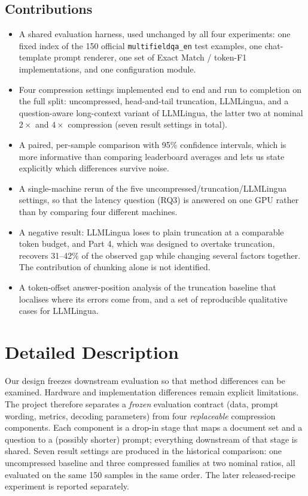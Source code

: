 \documentclass[10pt,a4paper,twocolumn]{article}
\begin{document}
\subsection{Contributions}

\begin{itemize}
    \item A shared evaluation harness, used unchanged by all four experiments: one
    fixed index of the 150 official \texttt{multifieldqa\_en} test examples, one
    chat-template prompt renderer, one set of Exact Match / token-F1
    implementations, and one configuration module.
    \item Four compression settings implemented end to end and run to completion on
    the full split: uncompressed, head-and-tail truncation, LLMLingua, and a
    question-aware long-context variant of LLMLingua, the latter two at nominal
    $2\times$ and $4\times$ compression (seven result settings in total).
    \item A paired, per-sample comparison with 95\% confidence intervals, which is
    more informative than comparing leaderboard averages and lets us state
    explicitly which differences survive noise.
    \item A single-machine rerun of the five uncompressed/truncation/LLMLingua
    settings, so that the latency question (RQ3) is answered on one GPU rather
    than by comparing four different machines.
    \item A negative result: LLMLingua loses to plain truncation at a comparable token budget, and Part 4, which was designed to overtake truncation, recovers 31--42\% of the observed gap while changing several factors together. The contribution of chunking alone is not identified.
    \item A token-offset answer-position analysis of the truncation baseline that
    localises where its errors come from, and a set of reproducible qualitative
    cases for LLMLingua.
\end{itemize}

\section{Detailed Description}

Our design freezes downstream evaluation so that method differences can be examined. Hardware and implementation differences remain explicit limitations. The project therefore separates a
\emph{frozen} evaluation contract (data, prompt wording, metrics, decoding
parameters) from four \emph{replaceable} compression components. Each component is
a drop-in stage that maps a document set and a question to a (possibly shorter)
prompt; everything downstream of that stage is shared. Seven result settings are
produced in the historical comparison: one uncompressed baseline and three compressed families at two nominal ratios, all evaluated on the same 150 samples in the same order. The later released-recipe experiment is reported separately.
\end{document}
